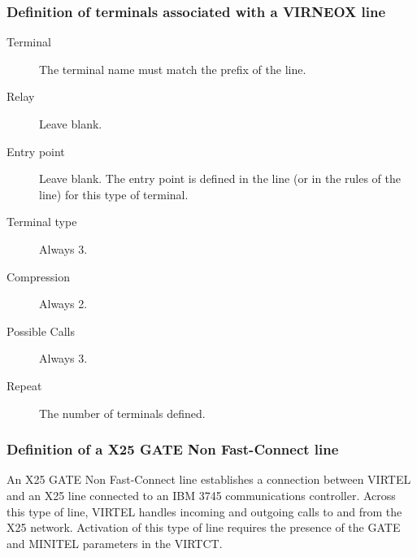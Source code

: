 \documentclass[letterpaper,10pt,english]{sphinxmanual}
\begin{document}
\subsubsection{Definition of terminals associated with a VIRNEOX line}
\label{\detokenize{connectivity_guide:definition-of-terminals-associated-with-a-virneox-line}}\begin{description}
\item[{Terminal}] \leavevmode
The terminal name must match the prefix of the line.

\item[{Relay}] \leavevmode
Leave blank.

\item[{Entry point}] \leavevmode
Leave blank. The entry point is defined in the line (or in the rules of the line) for this type of terminal.

\item[{Terminal type}] \leavevmode
Always 3.

\item[{Compression}] \leavevmode
Always 2.

\item[{Possible Calls}] \leavevmode
Always 3.

\item[{Repeat}] \leavevmode
The number of terminals defined.

\end{description}


\subsubsection{Definition of a X25 GATE Non Fast-Connect line}
\label{\detokenize{connectivity_guide:bookmark94}}\label{\detokenize{connectivity_guide:definition-of-a-x25-gate-non-fast-connect-line}}
An X25 GATE Non Fast-Connect line establishes a connection between VIRTEL and an X25 line connected to an IBM 3745 communications controller. Across this type of line, VIRTEL handles incoming and outgoing calls to and from the X25 network. Activation of this type of line requires the presence of the GATE and MINITEL parameters in the VIRTCT.
\end{document}
